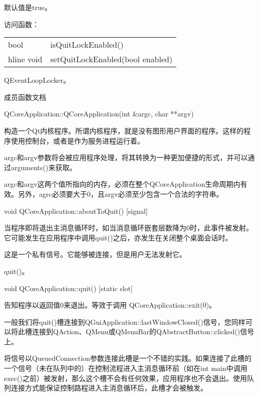 默认值是true。

访问函数：

\begin{tabular}{|l|l|}
\hline
bool&	isQuitLockEnabled()\\
hline
void&	setQuitLockEnabled(bool enabled)\\
\hline
\end{tabular}


\begin{seeAlso}
QEventLoopLocker。
\end{seeAlso}

\splitLine

成员函数文档

QCoreApplication::QCoreApplication(int \&argc, char **argv)

构造一个Qt内核程序。所谓内核程序，就是没有图形用户界面的程序。这样的程序使用控制台，或者是作为服务进程运行着。

argc和argv参数将会被应用程序处理，将其转换为一种更加便捷的形式，并可以通过arguments()来获取。


\begin{notice}[ 警告]
argc和argv这两个值所指向的内存，必须在整个QCoreApplication生命周期内有效。另外，agrc必须要大于0，且argv必须至少包含一个合法的字符串。
\end{notice}

void QCoreApplication::aboutToQuit() [signal]

当程序即将退出主消息循环时，如当消息循环嵌套层数降为0时，此事件被发射。它可能发生在应用程序中调用quit()之后，亦发生在关闭整个桌面会话时。



\begin{notice}
这是一个私有信号。它能够被连接，但是用户无法发射它。
\end{notice}

\begin{seeAlso}
quit()。
\end{seeAlso}

void QCoreApplication::quit() [static slot]

告知程序以返回值0来退出。等效于调用 QCoreApplication::exit(0)。

一般我们将quit()槽连接到QGuiApplication::lastWindowClosed()信号，您同样可以将此槽连接到QAction、QMenu或QMenuBar的QAbstractButton::clicked()信号上。

将信号以QueuedConnection参数连接此槽是一个不错的实践。如果连接了此槽的一个信号（未在队列中的）在控制流程进入主消息循环前（如在int main中调用exec()之前）被发射，那么这个槽不会有任何效果，应用程序也不会退出。使用队列连接方式能保证控制路程进入主消息循环后，此槽才会被触发。

